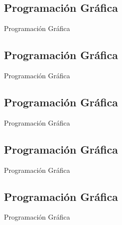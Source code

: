 \subsection{Programación Gráfica}
\begin{frame}{Programación Gráfica}
\end{frame}

\subsection{Programación Gráfica}
\begin{frame}{Programación Gráfica}
\end{frame}

\subsection{Programación Gráfica}
\begin{frame}{Programación Gráfica}
\end{frame}

\subsection{Programación Gráfica}
\begin{frame}{Programación Gráfica}
\end{frame}

\subsection{Programación Gráfica}
\begin{frame}{Programación Gráfica}
\end{frame}

